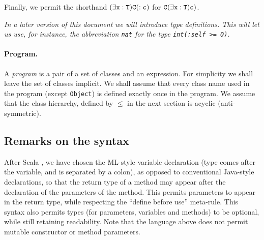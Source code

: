 \documentclass[nocopyrightspace,preprint,10pt]{sigplanconf}
\begin{document}
Finally, we permit the shorthand $\tt (\exists x:T) C(:c)$ for
$\tt C(\exists x:T)c)$.

{\em In a later version of this document we will introduce type definitions.
This will let us use, for instance, the abbreviation {\tt nat}
for the type {\tt int(:self >= 0)}. 
}

\paragraph{Program.}
A {\em program} is a pair of a set of classes and an expression. For
simplicity we shall leave the set of classes implicit. We shall assume
that every class name used in the program (except {\tt Object}) is
defined exactly once in the program. We assume that the class
hierarchy, defined by $\leq$ in the next section is acyclic
(anti-symmetric).

\subsection{Remarks on the syntax}


After Scala \cite{scala}, we have chosen the ML-style variable
declaration (type comes after the variable, and is separated by a
colon), as opposed to conventional Java-style declarations, so that
the return type of a method may appear after the declaration of the
parameters of the method. This permits parameters to appear in the
return type, while respecting the ``define before use''
meta-rule. This syntax also permits types (for parameters, variables
and methods) to be optional, while still retaining readability.  Note
that the language above does not permit mutable constructor or method
parameters.
\end{document}

